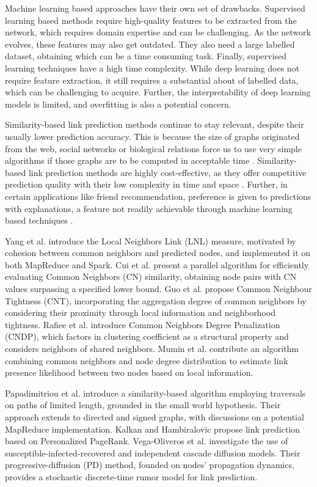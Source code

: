 Machine learning based approaches have their own set of drawbacks. Supervised learning based methods require high-quality features to be extracted from the network, which requires domain expertise and can be challenging. As the network evolves, these features may also get outdated. They also need a large labelled dataset, obtaining which can be a time consuming task. Finally, supervised learning techniques have a high time complexity. While deep learning does not require feature extraction, it still requires a substantial about of labelled data, which can be challenging to acquire. Further, the interpretability of deep learning models is limited, and overfitting is also a potential concern.

Similarity-based link prediction methods continue to stay relevant, despite their usually lower prediction accuracy. This is because the size of graphs originated from the web, social networks or biological relations force us to use very simple algorithms if those graphs are to be computed in acceptable time \cite{garcia2014link}. Similarity-based link prediction methods are highly cost-effective, as they offer competitive prediction quality with their low complexity in time and space \cite{zhou2021progresses}. Further, in certain applications like friend recommendation, preference is given to predictions with explanations, a feature not readily achievable through machine learning based techniques \cite{barbieri2014follow}.

Yang et al. \cite{yang2015new} introduce the Local Neighbors Link (LNL) measure, motivated by cohesion between common neighbors and predicted nodes, and implemented it on both MapReduce and Spark. Cui et al. \cite{cui2016bounded} present a parallel algorithm for efficiently evaluating Common Neighbors (CN) similarity, obtaining node pairs with CN values surpassing a specified lower bound. Guo et al. \cite{guo2019node} propose Common Neighbour Tightness (CNT), incorporating the aggregation degree of common neighbors by considering their proximity through local information and neighborhood tightness. Rafiee et al. \cite{rafiee2020cndp} introduce Common Neighbors Degree Penalization (CNDP), which factors in clustering coefficient as a structural property and considers neighbors of shared neighbors. Mumin et al. \cite{mumin2022efficient} contribute an algorithm combining common neighbors and node degree distribution to estimate link presence likelihood between two nodes based on local information.

Papadimitriou et al. \cite{papadimitriou2012fast} introduce a similarity-based algorithm employing traversals on paths of limited length, grounded in the small world hypothesis. Their approach extends to directed and signed graphs, with discussions on a potential MapReduce implementation. Kalkan and Hambiralovic \cite{kalkanfinding} propose link prediction based on Personalized PageRank. Vega-Oliveros et al. \cite{vega2021link} investigate the use of susceptible-infected-recovered and independent cascade diffusion models. Their progressive-diffusion (PD) method, founded on nodes' propagation dynamics, provides a stochastic discrete-time rumor model for link prediction.

